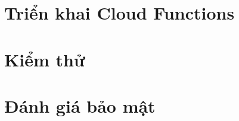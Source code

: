 \section{Triển khai Cloud Functions}
\label{sec:trien-khai-functions}

\section{Kiểm thử}
\label{sec:kiem-thu}

\section{Đánh giá bảo mật}
\label{sec:bao-mat}

